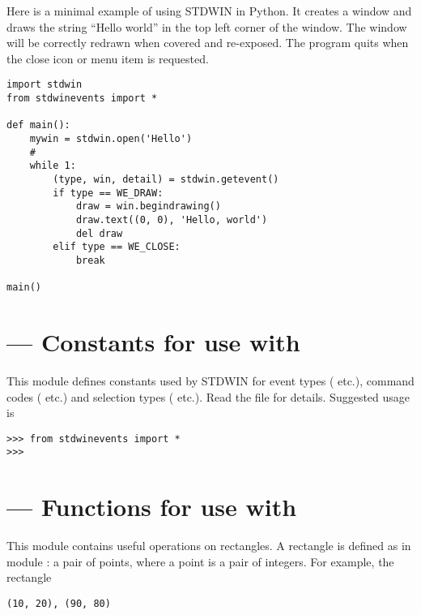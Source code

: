 Here is a minimal example of using STDWIN in Python.
It creates a window and draws the string ``Hello world'' in the top
left corner of the window.
The window will be correctly redrawn when covered and re-exposed.
The program quits when the close icon or menu item is requested.

\begin{verbatim}
import stdwin
from stdwinevents import *

def main():
    mywin = stdwin.open('Hello')
    #
    while 1:
        (type, win, detail) = stdwin.getevent()
        if type == WE_DRAW:
            draw = win.begindrawing()
            draw.text((0, 0), 'Hello, world')
            del draw
        elif type == WE_CLOSE:
            break

main()
\end{verbatim}

\section{ ---
         Constants for use with }



This module defines constants used by STDWIN for event types
( etc.), command codes ( etc.)
and selection types ( etc.).
Read the file for details.
Suggested usage is

\begin{verbatim}
>>> from stdwinevents import *
>>> 
\end{verbatim}

\section{ ---
         Functions for use with }



This module contains useful operations on rectangles.
A rectangle is defined as in module :
a pair of points, where a point is a pair of integers.
For example, the rectangle

\begin{verbatim}
(10, 20), (90, 80)
\end{verbatim}

